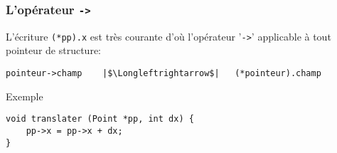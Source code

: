 \documentclass[table,handout,tikz,12pt,svgnames]{beamer}
\begin{document}
\begin{frame}[fragile=singleslide]
	\frametitle{L'opérateur \texttt{->}}
	\vspace{-0.7cm}
	\begin{itemize}
	\vspace{.3cm}
	\end{itemize}
				\begin{verbatim}
pointeur->champ    |$\Longleftrightarrow$|   (*pointeur).champ
				\end{verbatim}
	\begin{itemize}
		\begin{block}{}
			\item Exemple
		\end{block}
	\vspace{-0.2cm}	
	\end{itemize}
				\begin{verbatim}
void translater (Point *pp, int dx) {
	pp->x = pp->x + dx;
}
				\end{verbatim}				
\end{frame}



\end{document}
